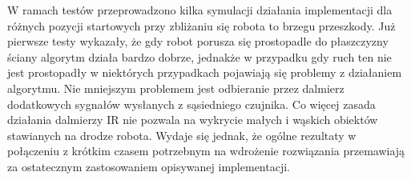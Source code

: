 W ramach testów przeprowadzono kilka symulacji działania implementacji dla
różnych pozycji startowych przy zbliżaniu się robota to brzegu przeszkody. Już
pierwsze testy wykazały, że gdy robot porusza się prostopadle do płaszczyzny
ściany algorytm działa bardzo dobrze, jednakże w przypadku gdy ruch ten nie jest
prostopadły w niektórych przypadkach pojawiają się problemy z działaniem
algorytmu. Nie mniejszym problemem jest odbieranie przez dalmierz dodatkowych
sygnałów wysłanych z sąsiedniego czujnika. Co więcej zasada działania dalmierzy
IR nie pozwala na wykrycie małych i wąskich obiektów stawianych na drodze
robota. Wydaje się jednak, że ogólne rezultaty w połączeniu z krótkim czasem
potrzebnym na wdrożenie rozwiązania przemawiają za ostatecznym zastosowaniem
opisywanej implementacji.
